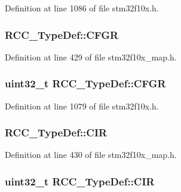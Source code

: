 Definition at line 1086 of file stm32f10x.\+h.

\subsubsection[{\texorpdfstring{C\+F\+GR}{CFGR}}]{ R\+C\+C\+\_\+\+Type\+Def\+::\+C\+F\+GR}\hypertarget{struct_r_c_c___type_def_a6bcdfb16e7c68a1625e84a179d7cf346}{}\label{struct_r_c_c___type_def_a6bcdfb16e7c68a1625e84a179d7cf346}


Definition at line 429 of file stm32f10x\+\_\+map.\+h.

\subsubsection[{\texorpdfstring{C\+F\+GR}{CFGR}}]{ {\bf uint32\+\_\+t} R\+C\+C\+\_\+\+Type\+Def\+::\+C\+F\+GR}\hypertarget{struct_r_c_c___type_def_a0721b1b729c313211126709559fad371}{}\label{struct_r_c_c___type_def_a0721b1b729c313211126709559fad371}


Definition at line 1079 of file stm32f10x.\+h.

\subsubsection[{\texorpdfstring{C\+IR}{CIR}}]{ R\+C\+C\+\_\+\+Type\+Def\+::\+C\+IR}\hypertarget{struct_r_c_c___type_def_a0d7fa9f27da52f637063518bd9732fca}{}\label{struct_r_c_c___type_def_a0d7fa9f27da52f637063518bd9732fca}


Definition at line 430 of file stm32f10x\+\_\+map.\+h.

\subsubsection[{\texorpdfstring{C\+IR}{CIR}}]{ {\bf uint32\+\_\+t} R\+C\+C\+\_\+\+Type\+Def\+::\+C\+IR}\hypertarget{struct_r_c_c___type_def_aeadf3a69dd5795db4638f71938704ff0}{}\label{struct_r_c_c___type_def_aeadf3a69dd5795db4638f71938704ff0}


